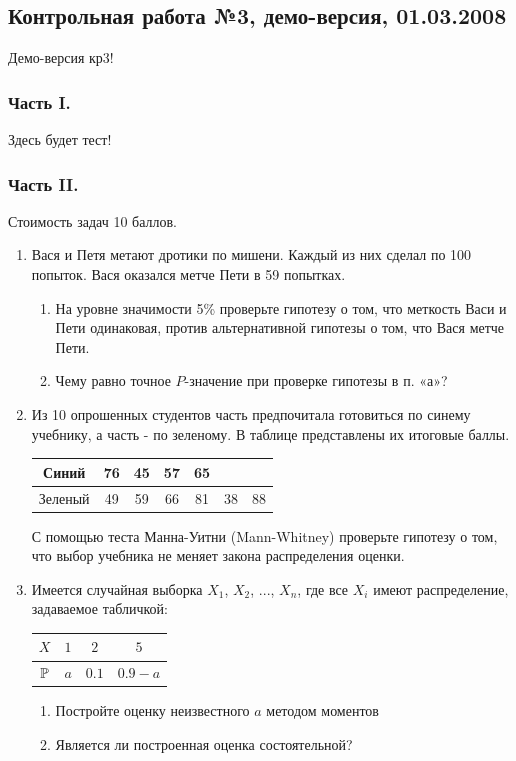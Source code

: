 \documentclass[12pt, a4paper]{article}\usepackage[]{graphicx}\usepackage[]{color}
\begin{document}
\subsection{Контрольная работа №3, демо-версия, 01.03.2008}

Демо-версия кр3!
\subsubsection*{Часть I.} Здесь будет тест!
\subsubsection*{Часть II.}

Стоимость задач 10 баллов.

\begin{enumerate}
\item Вася и Петя метают дротики по мишени. Каждый из них сделал
по 100 попыток. Вася оказался метче Пети в 59 попытках.
\begin{enumerate}
\item На уровне
значимости 5\% проверьте гипотезу о том, что меткость Васи и Пети
одинаковая, против альтернативной гипотезы о том, что Вася метче
Пети.
\item Чему равно точное $P$-значение при проверке гипотезы в п. «а»?
\end{enumerate}

\item Из 10 опрошенных студентов часть предпочитала готовиться по
синему учебнику, а часть - по зеленому. В таблице представлены их
итоговые баллы.

\begin{tabular}{c|cccccc}
  Синий & 76 & 45 & 57 & 65 &  &  \\
  \hline
  Зеленый & 49 & 59 & 66 & 81 & 38 & 88 \\
\end{tabular}

С помощью теста Манна-Уитни (Mann-Whitney) проверьте гипотезу о
том, что выбор учебника не меняет закона распределения оценки.

\item Имеется случайная выборка $X_{1}$, $X_{2}$, ..., $X_{n}$, где все $X_{i}$ имеют распределение, задаваемое табличкой:

\begin{tabular}{c|ccc}
$X$ & $ 1$ & $ 2$ & $ 5$ \\
\hline
$\P$ & $a$ & $ 0.1$ & $ 0.9-a$ \\
\end{tabular}
\begin{enumerate}
\item Постройте оценку неизвестного $a$ методом моментов
\item Является ли построенная оценка состоятельной?
\end{enumerate}


\end{enumerate}
\end{document}
